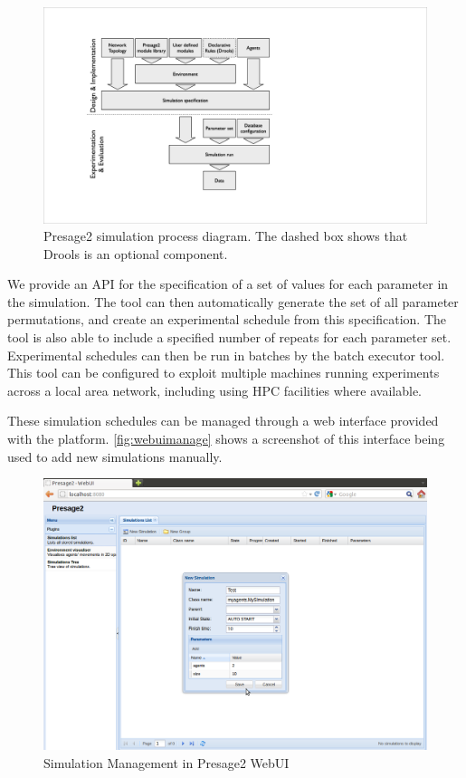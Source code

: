 \begin{figure}
\centering
\includegraphics[width=0.8\linewidth]{gfx/presage2/simulation_process}
\caption[Presage2 simulation process diagram]{Presage2 simulation process diagram. The dashed box shows that Drools is an optional component.}\label{fig:presage2process}
\end{figure}

We provide an \ac{API} for the specification of a set of values for each
parameter in the simulation. The tool can then automatically generate the set
of all parameter permutations, and create an experimental schedule from this
specification. The tool is also able to include a specified number of repeats
for each parameter set. Experimental schedules can then be run in batches by the
batch executor tool. This tool can be configured to exploit multiple machines
running experiments across a local area network, including using \ac{HPC}
facilities where available.

These simulation schedules can be managed through a web interface provided with
the platform. \autoref{fig:webuimanage} shows a screenshot of this interface
being used to add new simulations manually.

\begin{figure}
\includegraphics[width=\linewidth]{gfx/presage2/webui_manage}
\caption{Simulation Management in Presage2 WebUI}\label{fig:webuimanage}
\end{figure}

